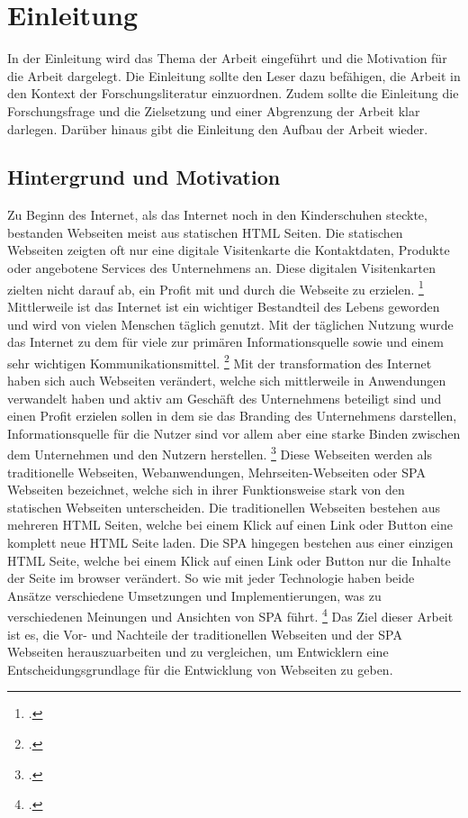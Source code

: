 
\section{Einleitung}
In der Einleitung wird das Thema der Arbeit eingeführt und die Motivation für die Arbeit dargelegt. 
Die Einleitung sollte den Leser dazu befähigen, die Arbeit in den Kontext der Forschungsliteratur einzuordnen.
Zudem sollte die Einleitung die Forschungsfrage und die Zielsetzung und einer Abgrenzung der Arbeit klar darlegen.
Darüber hinaus gibt die Einleitung den Aufbau der Arbeit wieder. 

\subsection{Hintergrund und Motivation}
Zu Beginn des Internet, als das Internet noch in den Kinderschuhen steckte, bestanden Webseiten meist aus statischen \ac{HTML} Seiten.
Die statischen Webseiten zeigten oft nur eine digitale Visitenkarte die Kontaktdaten, Produkte oder angebotene Services des Unternehmens an.
Diese digitalen Visitenkarten zielten nicht darauf ab, ein Profit mit und durch die Webseite zu erzielen. \footcite[Vgl.][Seite 1]{Bly2018}
Mittlerweile ist das Internet ist ein wichtiger Bestandteil des Lebens geworden und wird von vielen Menschen täglich genutzt.
Mit der täglichen Nutzung wurde das Internet zu dem für viele zur primären Informationsquelle sowie und einem sehr wichtigen Kommunikationsmittel. \footcite[Vgl.][Seite 1]{conf/pi/Sassenberg}
Mit der transformation des Internet haben sich auch Webseiten verändert, welche sich mittlerweile in Anwendungen verwandelt haben und aktiv am Geschäft des Unternehmens beteiligt sind und einen Profit erzielen sollen 
in dem sie das Branding des Unternehmens darstellen, Informationsquelle für die Nutzer sind vor allem aber eine starke Binden zwischen dem Unternehmen und den Nutzern herstellen. \footcite[Vgl.][Seite 1]{Bly2018}
Diese Webseiten werden als traditionelle Webseiten, Webanwendungen, Mehrseiten-Webseiten oder \ac{SPA} Webseiten bezeichnet, welche sich in ihrer Funktionsweise stark von den statischen Webseiten unterscheiden.
Die traditionellen Webseiten bestehen aus mehreren \ac{HTML} Seiten, welche bei einem Klick auf einen Link oder Button eine komplett neue \ac{HTML} Seite laden.
Die \ac{SPA} hingegen bestehen aus einer einzigen \ac{HTML} Seite, welche bei einem Klick auf einen Link oder Button nur die Inhalte der Seite im \gls{browser} verändert.
So wie mit jeder Technologie haben beide Ansätze verschiedene Umsetzungen und Implementierungen, was zu verschiedenen Meinungen und Ansichten von \ac{SPA} führt. \footcite[Vgl.][Seite 4]{Flanagan2011}
Das Ziel dieser Arbeit ist es, die Vor- und Nachteile der traditionellen Webseiten und der \ac{SPA} Webseiten herauszuarbeiten und zu vergleichen,
um Entwicklern eine Entscheidungsgrundlage für die Entwicklung von Webseiten zu geben.


